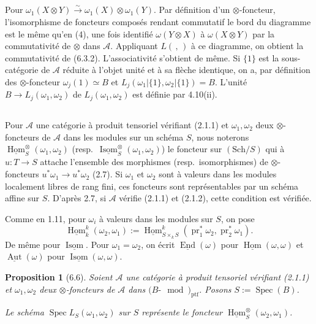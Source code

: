 \documentclass[12pt,a4paper]{article}
\theoremstyle{plain}
\newtheorem{proposition}[theorem]{Proposition}
\theoremstyle{definition}
\DeclareMathOperator{\Spec}{Spec}
\DeclareMathOperator{\Hom}{Hom}
\DeclareMathOperator{\End}{End}
\DeclareMathOperator{\Aut}{Aut}
\DeclareMathOperator{\Isom}{Isom}
\DeclareMathOperator{\ptf}{ptf}
\DeclareMathOperator{\pr}{pr}
\begin{document}
\nonstopmode
\setcounter{section}{5}
\setcounter{theorem}{4}

\subsection{}

Pour $\omega_1(X \otimes Y) \xrightarrow{\sim} \omega_1(X) \otimes \omega_1(Y)$. Par définition d'un $\otimes$-foncteur, l'isomorphisme de foncteurs composés rendant commutatif le bord du diagramme est le même qu'en (4), une fois identifié $\omega(Y \otimes X)$ à $\omega(X \otimes Y)$ par la commutativité de $\otimes$ dans $\mathcal{A}$. Appliquant $L(\, , \,)$ à ce diagramme, on obtient la commutativité de (6.3.2). L'associativité s'obtient de même. Si $\{1\}$ est la sous-catégorie de $\mathcal{A}$ réduite à l'objet unité et à sa flèche identique, on a, par définition des $\otimes$-foncteur $\omega_j(1) \simeq B$ et $L_j(\omega_1|\{1\}, \omega_2|\{1\}) = B$. L'unité $B \to L_j(\omega_1, \omega_2)$ de $L_j(\omega_1, \omega_2)$ est définie par 4.10(ii).

\subsection{}

Pour $\mathcal{A}$ une catégorie à produit tensoriel vérifiant (2.1.1) et $\omega_1, \omega_2$ deux $\otimes$-foncteurs de $\mathcal{A}$ dans les modules sur un schéma $S$, nous noterons $\underline{\Hom}^\otimes_S(\omega_1, \omega_2)$ (resp.~$\underline{\Isom}^\otimes_S(\omega_1, \omega_2)$) le foncteur sur $(\mathrm{Sch}/S)$ qui à $u : T \to S$ attache l'ensemble des morphismes (resp.~isomorphismes) de $\otimes$-foncteurs $u^*\omega_1 \to u^*\omega_2$ (2.7). Si $\omega_1$ et $\omega_2$ sont à valeurs dans les modules localement libres de rang fini, ces foncteurs sont représentables par un schéma affine sur $S$. D'après 2.7, si $\mathcal{A}$ vérifie (2.1.1) et (2.1.2), cette condition est vérifiée.

Comme en 1.11, pour $\omega_i$ à valeurs dans les modules sur $S$, on pose
\[
\underline{\Hom}^k_k(\omega_2, \omega_1) := \underline{\Hom}^k_{S \times_k S}(\pr_1^*\omega_2, \pr_2^*\omega_1).
\]
De même pour $\underline{\Isom}$. Pour $\omega_1 = \omega_2$, on écrit $\underline{\End}(\omega)$ pour $\underline{\Hom}(\omega, \omega)$ et $\underline{\Aut}(\omega)$ pour $\underline{\Isom}(\omega, \omega)$.

\begin{proposition}[6.6]
Soient $\mathcal{A}$ une catégorie à produit tensoriel vérifiant (2.1.1) et $\omega_1, \omega_2$ deux $\otimes$-foncteurs de $\mathcal{A}$ dans $(B\text{-}\mod)_{\ptf}$. Posons $S := \Spec(B)$.

Le schéma $\Spec L_S(\omega_1, \omega_2)$ sur $S$ représente le foncteur $\underline{\Hom}^\otimes_S(\omega_2, \omega_1)$.
\end{proposition}
\end{document}
